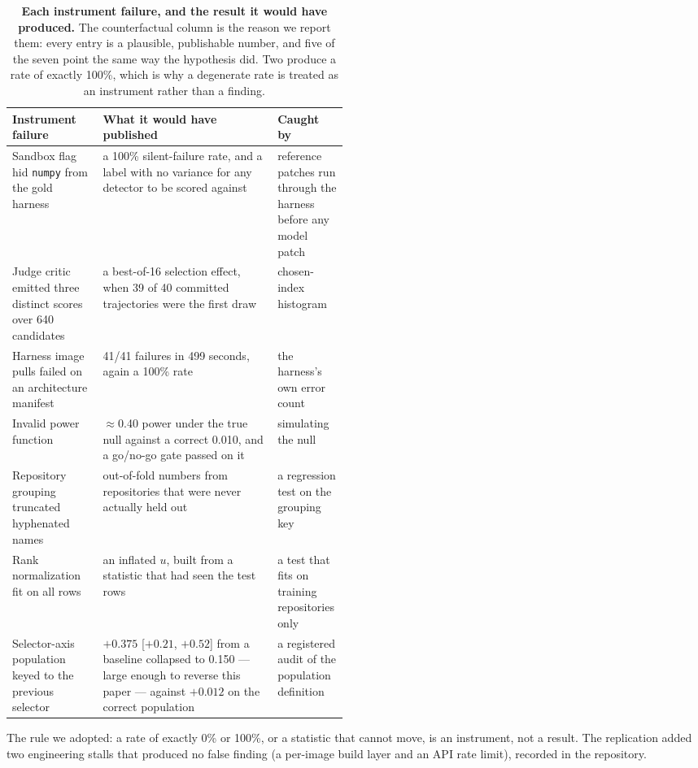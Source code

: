 \documentclass[11pt]{article}
\begin{document}
\begin{table}[t]\centering\footnotesize
\begin{tabularx}{\linewidth}{@{}p{0.27\linewidth}Xp{0.21\linewidth}@{}}\toprule
Instrument failure & What it would have published & Caught by \\\midrule
Sandbox flag hid \texttt{numpy} from the gold harness & a 100\% silent-failure rate, and a label with no variance for any detector to be scored against & reference patches run through the harness before any model patch \\
Judge critic emitted three distinct scores over 640 candidates & a best-of-16 selection effect, when 39 of 40 committed trajectories were the first draw & chosen-index histogram \\
Harness image pulls failed on an architecture manifest & 41/41 failures in 499 seconds, again a 100\% rate & the harness's own error count \\
Invalid power function & $\approx$0.40 power under the true null against a correct 0.010, and a go/no-go gate passed on it & simulating the null \\
Repository grouping truncated hyphenated names & out-of-fold numbers from repositories that were never actually held out & a regression test on the grouping key \\
Rank normalization fit on all rows & an inflated $u$, built from a statistic that had seen the test rows & a test that fits on training repositories only \\
Selector-axis population keyed to the previous selector & $+0.375$ [$+0.21$, $+0.52$] from a baseline collapsed to 0.150 --- large enough to reverse this paper --- against $+0.012$ on the correct population & a registered audit of the population definition \\\bottomrule
\end{tabularx}
\caption{\textbf{Each instrument failure, and the result it would have produced.} The counterfactual column is the reason we report them: every entry is a plausible, publishable number, and five of the seven point the same way the hypothesis did. Two produce a rate of exactly 100\%, which is why a degenerate rate is treated as an instrument rather than a finding.}\label{tab:counterfactual}\end{table}

The rule we adopted: a rate of exactly 0\% or 100\%, or a statistic that cannot move, is an instrument, not a result. The replication added two engineering stalls that produced no false finding (a per-image build layer and an API rate limit), recorded in the repository.
\end{document}
